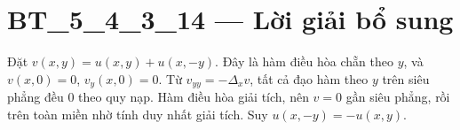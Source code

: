 \documentclass[10pt,a4paper]{article}
\begin{document}
\section*{BT\_5\_4\_3\_14 — Lời giải bổ sung}
Đặt $v(x,y)=u(x,y)+u(x,-y)$. Đây là hàm điều hòa chẵn theo $y$, và $v(x,0)=0$, $v_y(x,0)=0$. Từ $v_{yy}=-\Delta_xv$, tất cả đạo hàm theo $y$ trên siêu phẳng đều 0 theo quy nạp. Hàm điều hòa giải tích, nên $v=0$ gần siêu phẳng, rồi trên toàn miền nhờ tính duy nhất giải tích. Suy $u(x,-y)=-u(x,y)$.
\end{document}
